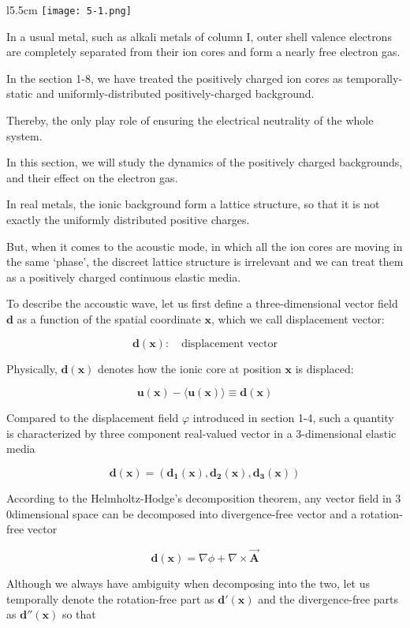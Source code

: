 ﻿\documentclass[twoside]{book}
\numberwithin{equation}{section}
\begin{document}
\begin{wrapfigure}{l}{5.5cm}
\texttt{[image: 5-1.png]}
\end{wrapfigure}

In a usual metal, such as alkali metals of column I, outer shell valence electrons are completely separated from their ion cores and form a nearly free electron gas. 

In the section 1-8, we have treated the positively charged ion cores as temporally-static and uniformly-distributed positively-charged background. 

Thereby, the only play role of ensuring the electrical neutrality of the whole system. 

In this section, we will study the dynamics of the positively charged backgrounds, and their effect on the electron gas. 

In real metals, the ionic background form a lattice structure, so that it is not exactly the uniformly distributed positive charges. 

But, when it comes to the acoustic mode, in which all the ion cores are moving in the same `phase', the discreet lattice structure is irrelevant and we can treat them as a positively charged continuous elastic media. 

To describe the accoustic wave, let us first define a three-dimensional vector field $\bm d$ as a function of the spatial coordinate $\bm x$, which we call displacement vector:

\[\bm{d}(\bm{x}):\quad\text{displacement vector} \]

Physically, $\bm{d(x)}$ denotes how the ionic core at position $\bm x$ is displaced:

\[\bm{u(x) - \langle u(x)\rangle \equiv d(x)} \]

Compared to the displacement field $\varphi$ introduced in section 1-4, such a quantity is characterized by three component real-valued vector in a $3$-dimensional elastic media

\[\bm{d(x) = (d_1(x),d_2(x),d_3(x))} \]

According to the Helmholtz-Hodge's decomposition theorem, any vector field in $3$0dimensional space can be decomposed into divergence-free vector and a rotation-free vector

\[\bm{d(x)} = \nabla\phi + \nabla\times\vec{\bm{A}} \]

Although we always have ambiguity when decomposing into the two, let us temporally denote the rotation-free part as $\bm{d'(x)}$ and the divergence-free parts as $\bm{d''(x)}$ so that
\end{document}
